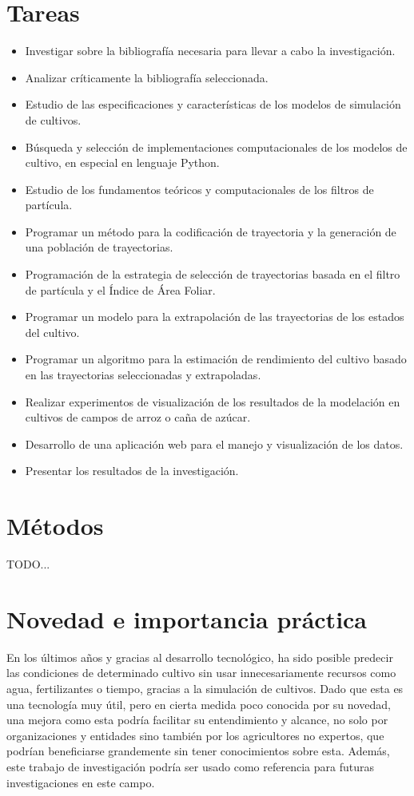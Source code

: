 \section*{Tareas}
\begin{itemize}
	\item Investigar sobre la bibliografía necesaria para llevar a cabo la investigación.
	\item Analizar críticamente la bibliografía seleccionada.
	\item Estudio de las especificaciones y características de los modelos de simulación de cultivos.
	\item Búsqueda y selección de implementaciones computacionales de los modelos de cultivo, en especial en lenguaje Python.
	\item Estudio de los fundamentos teóricos y computacionales de los filtros de partícula.
	\item Programar un método para la codificación de trayectoria y la generación de una población de trayectorias.
	\item Programación de la estrategia de selección de trayectorias basada en el filtro de partícula y el Índice de Área Foliar.
	\item Programar un modelo para la extrapolación de las trayectorias de los estados del cultivo.
	\item Programar un algoritmo para la estimación de rendimiento del cultivo basado en las trayectorias seleccionadas y extrapoladas.
	\item Realizar experimentos de visualización de los resultados de la modelación en cultivos de campos de arroz o caña de azúcar.
	\item Desarrollo de una aplicación web para el manejo y visualización de los datos.
	\item Presentar los resultados de la investigación.
\end{itemize}

\section*{Métodos}
TODO...

\section*{Novedad e importancia práctica}
En los últimos años y gracias al desarrollo tecnológico, ha sido posible predecir las condiciones de determinado cultivo sin usar innecesariamente recursos como agua, fertilizantes o tiempo, gracias a la simulación de cultivos. Dado que esta es una tecnología muy útil, pero en cierta medida poco conocida por su novedad,  una mejora como esta podría facilitar su entendimiento y alcance, no solo por organizaciones y entidades sino también por los agricultores no expertos, que podrían beneficiarse grandemente sin tener conocimientos sobre esta. Además, este trabajo de investigación podría ser usado como referencia para futuras investigaciones en este campo.

